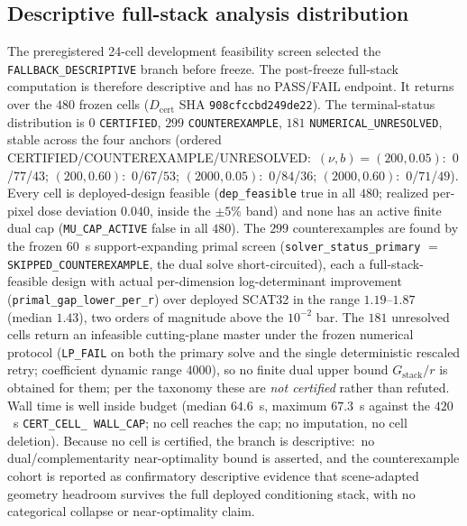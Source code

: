 \documentclass[10pt]{article}
\begin{document}
\subsection{Descriptive full-stack analysis distribution}
The preregistered 24-cell development feasibility screen selected the
\texttt{FALLBACK\_DESCRIPTIVE} branch before freeze. The post-freeze full-stack
computation is therefore descriptive and has no PASS/FAIL endpoint. It returns
over the $480$ frozen cells ($D_{\mathrm{cert}}$ SHA
\texttt{908cfccbd249de22}). The terminal-status distribution is $0$
\texttt{CERTIFIED}, $299$ \texttt{COUNTEREXAMPLE}, $181$
\texttt{NUMERICAL\_UNRESOLVED}, stable across the four anchors (ordered
CERTIFIED/COUNTEREXAMPLE/UNRESOLVED:\ $(\nu,b)=(200,0.05)$:\ $0$/$77$/$43$;
$(200,0.60)$:\ $0$/$67$/$53$; $(2000,0.05)$:\ $0$/$84$/$36$; $(2000,0.60)$:\
$0$/$71$/$49$). Every cell is deployed-design feasible (\texttt{dep\_feasible}
true in all $480$; realized per-pixel dose deviation $0.040$, inside the
$\pm5\%$ band) and none has an active finite dual cap
(\texttt{MU\_CAP\_ACTIVE} false in all $480$). The $299$ counterexamples are
found by the frozen $60$~s support-expanding primal screen
(\texttt{solver\_status\_primary} $=$ \texttt{SKIPPED\_COUNTEREXAMPLE}, the
dual solve short-circuited), each a full-stack-feasible design with actual
per-dimension log-determinant improvement (\texttt{primal\_gap\_lower\_per\_r})
over deployed \textsc{SCAT32} in the range $1.19$--$1.87$ (median $1.43$), two
orders of magnitude above the $10^{-2}$ bar. The $181$ unresolved cells return
an infeasible cutting-plane master under the frozen numerical protocol
(\texttt{LP\_FAIL} on both the primary solve and the single deterministic
rescaled retry; coefficient dynamic range $4000$), so no finite dual upper
bound $G_{\mathrm{stack}}/r$ is obtained for them; per the taxonomy these are
\emph{not certified} rather than refuted. Wall time is well inside budget
(median $64.6$~s, maximum $67.3$~s against the $420$~s \texttt{CERT\_CELL\_%
WALL\_CAP}; no cell reaches the cap; no imputation, no cell deletion). Because
no cell is certified, the branch is descriptive:\ no dual/complementarity
near-optimality bound is asserted, and the counterexample cohort is reported
as confirmatory descriptive evidence that scene-adapted geometry headroom
survives the full deployed conditioning stack, with no categorical collapse or
near-optimality claim.
\end{document}
